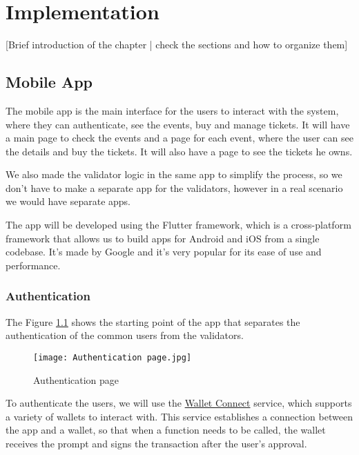 \chapter{Implementation}
\label{ch:implementation}

[Brief introduction of the chapter | check the sections and how to organize them]

\section{Mobile App}
\label{sec:mobile_app}

The mobile app is the main interface for the users to interact with the system,
where they can authenticate, see the events, buy and manage tickets. It will
have a main page to check the events and a page for each event, where the user
can see the details and buy the tickets. It will also have a page to see the
tickets he owns.

We also made the validator logic in the same app to simplify the process, so we
don't have to make a separate app for the validators, however in a real
scenario we would have separate apps.

The app will be developed using the Flutter framework, which is a
cross-platform framework that allows us to build apps for Android and iOS from
a single codebase. It's made by Google and it's very popular for its ease of
use and performance.

\subsection{Authentication}
\label{subsec:authentication}

The Figure \ref{fig:authentication_page} shows the starting point of the app
that separates the authentication of the common users from the validators.

\begin{figure}[H]
	\texttt{[image: Authentication page.jpg]}
	\centering
	\caption{Authentication page}
	\label{fig:authentication_page}
\end{figure}

To authenticate the users, we will use the
\href{https://walletconnect.com/}{Wallet Connect} service, which supports a
variety of wallets to interact with. This service establishes a connection
between the app and a wallet, so that when a function needs to be called, the
wallet receives the prompt and signs the transaction after the user's approval.

